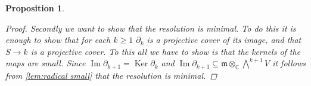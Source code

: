 \documentclass[11pt, a4paper, english]{article}
\newtheorem{prop}{Proposition}
\numberwithin{prop}{section}
\numberwithin{lemma}{section}
\numberwithin{theorem}{section}
\numberwithin{defin}{section}
\numberwithin{example}{section}
\newcommand{\C}{\mathbb{C}}
\DeclareMathOperator{\Tor}{Tor}
\DeclareMathOperator{\Image}{Im}
\DeclareMathOperator{\Ker}{Ker}
\begin{document}
\begin{prop}
\begin{proof}
Secondly we want to show that the resolution is minimal. To do this it is enough to show that for each $k \geq 1$ $\partial_k$ is a projective cover of its image, and that $S \to k$ is a projective cover. To this all we have to show is that the kernels of the maps are small. Since $\Image \partial_{k+1} = \Ker \partial_k$ and $\Image \partial_{k+1} \subseteq \mathfrak{m} \otimes_\C \bigwedge\limits^{k+1}V$ it follows from \cref{lem:radical small} that the resolution is minimal.
\iffalse
Secondly want to show that this resolution is minimal. To do this we will show that $\Tor^n_S(\C, \C) \neq 0$. Then since Tor is independent of projective resolution, there cannot be a projective resolution of $\C$ with 0 in $n$-th degree. To calculate Tor we use our resolution
\begin{center}
\begin{tikzcd}
0  \arrow{r} & \C \otimes_S S \otimes_\C \bigwedge\limits^n V  \arrow{r}{\C \otimes_S \partial_n} &  \C \otimes_S S \otimes_\C \bigwedge\limits^{n-1} V \\
0  \arrow{r} & \C \otimes_\C \bigwedge\limits^n V  \arrow{r}{\C \otimes_S \partial_n} &  \C \otimes_\C \bigwedge\limits^{n-1} V 
\end{tikzcd}
\end{center}
Since $\partial_n$ involves multiplication by $x_i$ and $\C x_i = 0$ ($\C = S/\langle x_i \rangle_{i=1}^n$), we have that $\C \otimes_S \partial_n = 0$ and $\Tor^n_S(\C, \C) = \C \otimes_C \bigwedge\limits^n V $ which certainly is non-zero. 
\fi
\end{proof}
\end{prop}
\end{document}
